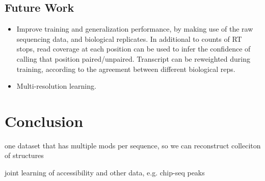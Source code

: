 \documentclass{proposal}
\begin{document}
\section{Future Work}

\begin{itemize}
  \item Improve training and generalization performance, by making use of the raw sequencing data, and biological replicates.
  In additional to counts of RT stops, read coverage at each position can be used to infer the confidence of calling that position paired/unpaired.
  Transcript can be reweighted during training, according to the agreement between different biological reps.

  \item Multi-resolution learning.
\end{itemize}


%
%

\chapter{Conclusion}

one dataset that has multiple mods per sequence, so we can reconstruct colleciton of structures

joint learning of accessibility and other data, e.g. chip-seq peaks




\end{document}
